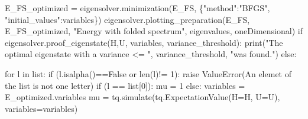 \documentclass[
  letterpaper,
  DIV=11,
  numbers=noendperiod]{scrartcl}
\newenvironment{Shaded}{\begin{snugshade}}{\end{snugshade}}
\newcommand{\BuiltInTok}[1]{\textcolor[rgb]{0.00,0.23,0.31}{#1}}
\newcommand{\ControlFlowTok}[1]{\textcolor[rgb]{0.00,0.23,0.31}{#1}}
\newcommand{\DecValTok}[1]{\textcolor[rgb]{0.68,0.00,0.00}{#1}}
\newcommand{\KeywordTok}[1]{\textcolor[rgb]{0.00,0.23,0.31}{#1}}
\newcommand{\NormalTok}[1]{\textcolor[rgb]{0.00,0.23,0.31}{#1}}
\newcommand{\OperatorTok}[1]{\textcolor[rgb]{0.37,0.37,0.37}{#1}}
\newcommand{\PreprocessorTok}[1]{\textcolor[rgb]{0.68,0.00,0.00}{#1}}
\newcommand{\StringTok}[1]{\textcolor[rgb]{0.13,0.47,0.30}{#1}}
\newcommand{\VariableTok}[1]{\textcolor[rgb]{0.07,0.07,0.07}{#1}}
\begin{document}
\begin{Shaded}
\begin{Highlighting}[]
\NormalTok{        E\_FS\_optimized }\OperatorTok{=}\NormalTok{ eigensolver.minimization(E\_FS, \{}\StringTok{"method"}\NormalTok{:}\StringTok{"BFGS"}\NormalTok{, }\StringTok{"initial\_values"}\NormalTok{:variables\})}
\NormalTok{        eigensolver.plotting\_preparation(E\_FS, E\_FS\_optimized, }\StringTok{"Energy with folded spectrum"}\NormalTok{, eigenvalues, oneDimensional)}
        \ControlFlowTok{if}\NormalTok{ eigensolver.proof\_eigenstate(H,U, variables, variance\_threshold):}
                \BuiltInTok{print}\NormalTok{(}\StringTok{"The optimal eigenstate with a variance \textless{}= "}\NormalTok{, variance\_threshold, }\StringTok{"was found."}\NormalTok{)}
    \ControlFlowTok{else}\NormalTok{:}
        
        \ControlFlowTok{for}\NormalTok{ l }\KeywordTok{in} \BuiltInTok{list}\NormalTok{:}
            \ControlFlowTok{if}\NormalTok{ (l.isalpha()}\OperatorTok{==}\VariableTok{False} \KeywordTok{or} \BuiltInTok{len}\NormalTok{(l)}\OperatorTok{!=} \DecValTok{1}\NormalTok{):}
                \ControlFlowTok{raise} \PreprocessorTok{ValueError}\NormalTok{(}\StringTok{\textquotesingle{}An elemet of the list is not one letter\textquotesingle{}}\NormalTok{)}
            \ControlFlowTok{if}\NormalTok{ (l }\OperatorTok{==} \BuiltInTok{list}\NormalTok{[}\DecValTok{0}\NormalTok{]):}
\NormalTok{                mu }\OperatorTok{=} \DecValTok{1}
            \ControlFlowTok{else}\NormalTok{:}
\NormalTok{                variables }\OperatorTok{=}\NormalTok{ E\_optimized.variables}
\NormalTok{                mu }\OperatorTok{=}\NormalTok{ tq.simulate(tq.ExpectationValue(H}\OperatorTok{=}\NormalTok{H, U}\OperatorTok{=}\NormalTok{U), variables}\OperatorTok{=}\NormalTok{variables)}


\end{Highlighting}
\end{Shaded}
\end{document}
